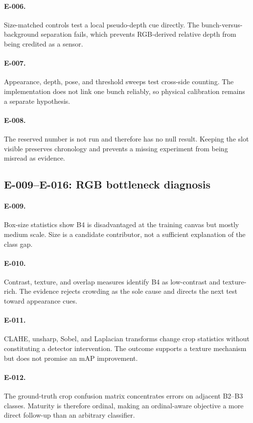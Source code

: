 \documentclass[preprint,12pt]{elsarticle}
\begin{document}
\paragraph{E-006.} Size-matched controls test a local pseudo-depth cue directly.
The bunch-versus-background separation fails, which prevents RGB-derived
relative depth from being credited as a sensor.
\paragraph{E-007.} Appearance, depth, pose, and threshold sweeps test
cross-side counting. The implementation does not link one bunch reliably, so
physical calibration remains a separate hypothesis.
\paragraph{E-008.} The reserved number is not run and therefore has no null
result. Keeping the slot visible preserves chronology and prevents a missing
experiment from being misread as evidence.

\subsection{E-009--E-016: RGB bottleneck diagnosis}
\paragraph{E-009.} Box-size statistics show B4 is disadvantaged at the
training canvas but mostly medium scale. Size is a candidate contributor, not
a sufficient explanation of the class gap.
\paragraph{E-010.} Contrast, texture, and overlap measures identify B4 as
low-contrast and texture-rich. The evidence rejects crowding as the sole
cause and directs the next test toward appearance cues.
\paragraph{E-011.} CLAHE, unsharp, Sobel, and Laplacian transforms change crop
statistics without constituting a detector intervention. The outcome supports
a texture mechanism but does not promise an mAP improvement.
\paragraph{E-012.} The ground-truth crop confusion matrix concentrates errors
on adjacent B2--B3 classes. Maturity is therefore ordinal, making an
ordinal-aware objective a more direct follow-up than an arbitrary classifier.
\end{document}
